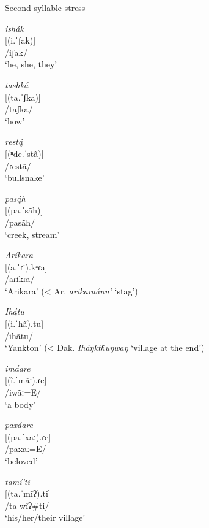 \begin{exe}
\item\label{secondsyllable} Second-syllable stress

\begin{xlist}
\item 	\textit{ishák}\\
    {[}(i.ˈʃak)]\\
    /iʃak/\\
    `he, she, they'

\item \textit{tashká}\\
    {[}(ta.ˈʃka)]\\
    /taʃka/\\
    `how'

\item \textit{restą́}\\
    {[}(ⁿde.ˈstã)]\\
    /ɾestã/\\
    `bullsnake'

\item \textit{pasą́h}\\
    {[}(pa.ˈsãh)]\\
    /pasãh/\\
    `creek, stream'

\item \textit{Aríkara}\\
    {[}(a.ˈɾi).kᵃɾa]\\
    /aɾikɾa/\\
    `Arikara' (< Ar. \textit{arikaraánu'} `stag')

\item \textit{Ihą́tu}\\
    {[}(i.ˈhã).tu]\\
    /ihãtu/\\
    `Yankton' (< Dak. \textit{Iháŋktȟuŋwaŋ} `village at the end')

\item \textit{imáare}\\
    {[}(ĩ.ˈmãː).ɾe]\\
    /iwãː=E/\\
    `a body'

\item \textit{paxáare}\\
    {[}(pa.ˈxaː).ɾe]\\
    /paxaː=E/\\
    `beloved'

\item \textit{tamí'ti}\\
    {[}(ta.ˈmĩʔ).ti]\\
    /ta-wĩʔ\#ti/\\
    `his/her/their village'


\end{xlist}
\end{exe}
